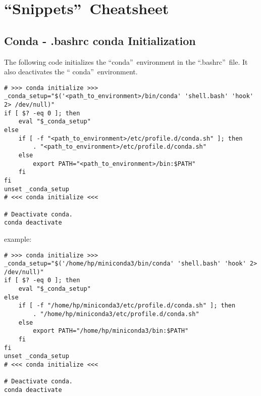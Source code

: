 \section{\textquotedblleft Snippets\textquotedblright\ Cheatsheet}


\subsection{Conda - .bashrc conda Initialization}

The following code initializes the \textquotedblleft conda\textquotedblright\ environment in the
\textquotedblleft .bashrc\textquotedblright\ file. It also deactivates the \textquotedblleft 
conda\textquotedblright\ environment.
\begin{verbatim}
# >>> conda initialize >>>
_conda_setup="$('<path_to_environment>/bin/conda' 'shell.bash' 'hook' 2> /dev/null)"
if [ $? -eq 0 ]; then
    eval "$_conda_setup"
else
    if [ -f "<path_to_environment>/etc/profile.d/conda.sh" ]; then
        . "<path_to_environment>/etc/profile.d/conda.sh"
    else
        export PATH="<path_to_environment>/bin:$PATH"
    fi
fi
unset _conda_setup
# <<< conda initialize <<<

# Deactivate conda.
conda deactivate
\end{verbatim}

example:
\begin{verbatim}
# >>> conda initialize >>>
_conda_setup="$('/home/hp/miniconda3/bin/conda' 'shell.bash' 'hook' 2> /dev/null)"
if [ $? -eq 0 ]; then
    eval "$_conda_setup"
else
    if [ -f "/home/hp/miniconda3/etc/profile.d/conda.sh" ]; then
        . "/home/hp/miniconda3/etc/profile.d/conda.sh"
    else
        export PATH="/home/hp/miniconda3/bin:$PATH"
    fi
fi
unset _conda_setup
# <<< conda initialize <<<

# Deactivate conda.
conda deactivate
\end{verbatim}




